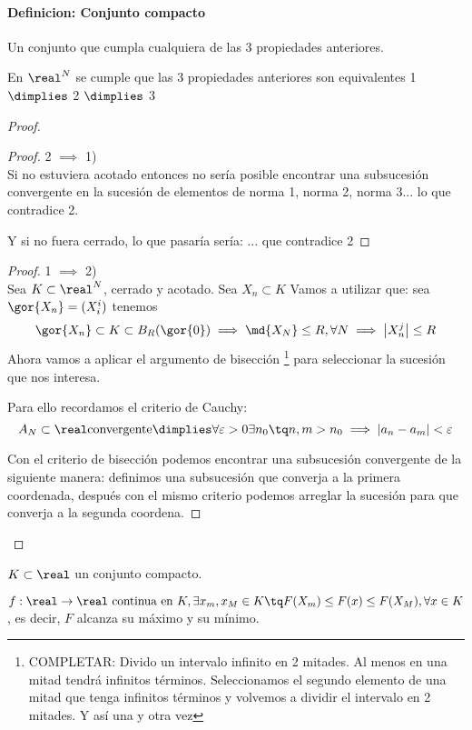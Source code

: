 \documentclass[a4paper,10pt]{apuntes}
\newcommand{\definition}[1]{\paragraph{Definicion: #1\\}}
\begin{document}
\definition{Conjunto compacto}
Un conjunto que cumpla cualquiera de las 3 propiedades anteriores.
\begin{theorem}
 En $\real^N$ se cumple que las 3 propiedades anteriores son equivalentes 1 $\dimplies$ 2 $\dimplies$ 3
\end{theorem}
\begin{proof}
\begin{proof}
 2 $\implies$ 1)\\
 Si no estuviera acotado entonces no sería posible encontrar una subsucesión convergente en la sucesión de elementos de norma 1, norma 2, norma 3... lo que contradice 2.
 
 Y si no fuera cerrado, lo que pasaría sería: ... que contradice 2
 \end{proof}
 \begin{proof}
 1 $\implies$ 2)\\
 Sea $K \subset \real^N$, cerrado y acotado. Sea ${X_n}\subset K$
 Vamos a utilizar que: sea $\gor{X_n} = (X_i^i)$ tenemos
 $$\gor{X_n}\subset K \subset B_R(\gor{0}) \implies \md{X_N} \leq R, \forall N \implies \left|X_n^j\right| \leq R$$
 Ahora vamos a aplicar el argumento de bisección \footnote{COMPLETAR: Divido un intervalo infinito en 2 mitades. Al menos en una mitad tendrá infinitos términos. Seleccionamos el segundo elemento de una mitad que tenga infinitos términos y volvemos a dividir el intervalo en 2 mitades. Y así una y otra vez} para seleccionar la sucesión que nos interesa.
 
 Para ello recordamos el criterio de Cauchy:
 $${A_N} \subset \real \text{convergente} \dimplies \forall \varepsilon > 0 \exists n_0 \tq n,m>n_0 \implies |a_n - a_m| < \varepsilon$$
 
 Con el criterio de bisección podemos encontrar una subsucesión convergente de la siguiente manera: definimos una subsucesión que converja a la primera coordenada, después con el mismo criterio podemos arreglar la sucesión para que converja a la segunda coordena.

 \end{proof}
 
\end{proof}
\begin{theorem}
 $K\subset \real$ un conjunto compacto.
 
 $f:\real \rightarrow \real \text{ continua en } K,  \exists  x_m,x_M \in K \tq F(X_m) \leq F(x) \leq F(X_M), \forall x \in K$, es decir, $F$ alcanza su máximo y su mínimo.
\end{theorem}
\end{document}
